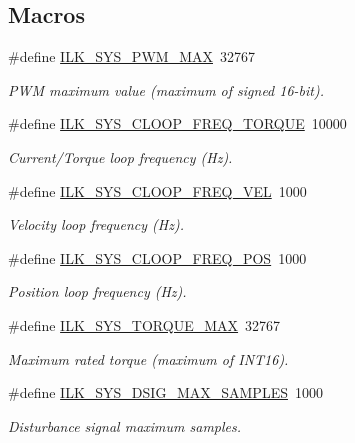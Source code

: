 \subsection*{Macros}
\begin{DoxyCompactItemize}
\item 
\#define \hyperlink{group__IL__CONST__SYS_gaefbce026149e3fd1ca4912e8b831e1c0}{I\+L\+K\+\_\+\+S\+Y\+S\+\_\+\+P\+W\+M\+\_\+\+M\+AX}~32767
\begin{DoxyCompactList}\small\item\em P\+WM maximum value (maximum of signed 16-\/bit). \end{DoxyCompactList}\item 
\#define \hyperlink{group__IL__CONST__SYS_gaebdf8cd11949f44b6f98507754e2eda5}{I\+L\+K\+\_\+\+S\+Y\+S\+\_\+\+C\+L\+O\+O\+P\+\_\+\+F\+R\+E\+Q\+\_\+\+T\+O\+R\+Q\+UE}~10000
\begin{DoxyCompactList}\small\item\em Current/\+Torque loop frequency (Hz). \end{DoxyCompactList}\item 
\#define \hyperlink{group__IL__CONST__SYS_gab7567b15639de41f00debc89e8cf69c1}{I\+L\+K\+\_\+\+S\+Y\+S\+\_\+\+C\+L\+O\+O\+P\+\_\+\+F\+R\+E\+Q\+\_\+\+V\+EL}~1000
\begin{DoxyCompactList}\small\item\em Velocity loop frequency (Hz). \end{DoxyCompactList}\item 
\#define \hyperlink{group__IL__CONST__SYS_ga0936a074e3c6022add3b4dd936d7472e}{I\+L\+K\+\_\+\+S\+Y\+S\+\_\+\+C\+L\+O\+O\+P\+\_\+\+F\+R\+E\+Q\+\_\+\+P\+OS}~1000
\begin{DoxyCompactList}\small\item\em Position loop frequency (Hz). \end{DoxyCompactList}\item 
\#define \hyperlink{group__IL__CONST__SYS_ga7d97997e842304310662f2b151281a9f}{I\+L\+K\+\_\+\+S\+Y\+S\+\_\+\+T\+O\+R\+Q\+U\+E\+\_\+\+M\+AX}~32767
\begin{DoxyCompactList}\small\item\em Maximum rated torque (maximum of I\+N\+T16). \end{DoxyCompactList}\item 
\#define \hyperlink{group__IL__CONST__SYS_ga67fd909fd6fa467e246a1d03aaaab058}{I\+L\+K\+\_\+\+S\+Y\+S\+\_\+\+D\+S\+I\+G\+\_\+\+M\+A\+X\+\_\+\+S\+A\+M\+P\+L\+ES}~1000
\begin{DoxyCompactList}\small\item\em Disturbance signal maximum samples. \end{DoxyCompactList}\end{DoxyCompactItemize}


